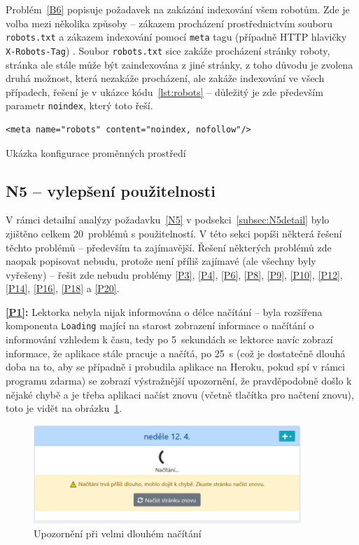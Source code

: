 Problém~\ref{B6} popisuje požadavek na zakázání indexování všem robotům. Zde je volba mezi několika způsoby -- zákazem procházení prostřednictvím souboru \verb|robots.txt| a zákazem indexování pomocí \verb|meta| tagu (případně HTTP hlavičky \verb|X-Robots-Tag|) \cite{roboti}. Soubor \verb|robots.txt| sice zakáže procházení stránky roboty, stránka ale stále může být zaindexována z jiné stránky, z toho důvodu je zvolena druhá možnost, která nezakáže procházení, ale zakáže indexování ve všech případech, řešení je v ukázce kódu~\ref{lst:robots} -- důležitý je zde především parametr \verb|noindex|, který toto řeší. 

\begin{listing}[ht]
	\begin{verbatim}
<meta name="robots" content="noindex, nofollow"/>
	\end{verbatim}
	\caption{Ukázka konfigurace proměnných prostředí}\label{lst:robots}
\end{listing}

\subsection{N5 -- vylepšení použitelnosti}

V rámci detailní analýzy požadavku~\ref{N5} v podsekci~\ref{subsec:N5detail} bylo zjištěno celkem 20~problémů s použitelností. V této sekci popíši některá řešení těchto problémů -- především ta zajímavější. Řešení některých problémů zde naopak popisovat nebudu, protože není příliš zajímavé (ale všechny byly vyřešeny) -- řešit zde nebudu problémy \ref{P3}, \ref{P4}, \ref{P6}, \ref{P8}, \ref{P9}, \ref{P10}, \ref{P12}, \ref{P14}, \ref{P16}, \ref{P18} a \ref{P20}.
 
\textbf{\ref{P1}:} Lektorka nebyla nijak informována o délce načítání -- byla rozšířena komponenta \verb|Loading| mající na starost zobrazení informace o načítání o informování vzhledem k času, tedy po 5~sekundách se lektorce navíc zobrazí informace, že aplikace stále pracuje a načítá, po 25~s (což je dostatečně dlouhá doba na to, aby se případně i probudila aplikace na Heroku, pokud spí v rámci programu zdarma) se zobrazí výstražnější upozornění, že pravděpodobně došlo k nějaké chybě a je třeba aplikaci načíst znovu (včetně tlačítka pro načtení znovu), toto je vidět na obrázku~\ref{fig:ui-screen-loading}.

\begin{figure}[h]\centering
    \includegraphics[width=0.9\textwidth]{img/ui-screen-loading.png}
    \caption{Upozornění při velmi dlouhém načítání}\label{fig:ui-screen-loading}
\end{figure}

